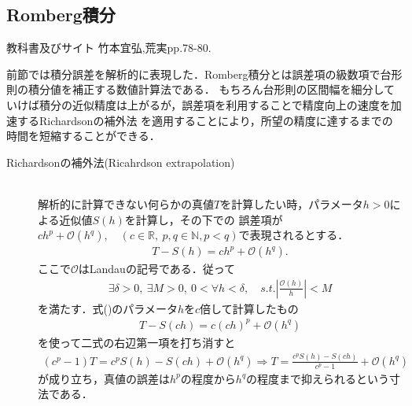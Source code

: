 \documentclass[a4j,papersize,disablejfam,slide,14pt]{jsarticle}
\begin{document}
\subsection{{\rm Romberg}積分}
	\begin{itembox}[l]{教科書及びサイト}
    	{\rm 竹本宜弘,荒実\cite{pascal_numerical}pp.78-80.}
    \end{itembox}
	前節では積分誤差を解析的に表現した．{\rm Romberg}積分とは誤差項の級数項で台形則の積分値を補正する数値計算法である．
    もちろん台形則の区間幅を細分していけば積分の近似精度は上がるが，誤差項を利用することで精度向上の速度を加速する{\rm Richardson}の補外法
    を適用することにより，所望の精度に達するまでの時間を短縮することができる．
    \begin{screen}
    	\begin{description}
        	\item[{\rm Richardson}の補外法({\rm Ricahrdson extrapolation})]\mbox{}\\
            	解析的に計算できない何らかの真値$T$を計算したい時，パラメータ$h>0$による近似値$S(h)$を計算し，その下での
                誤差項が$c h^p + \mathcal{O}(h^q), \quad(c \in \mathbb{R},\ p, q \in \mathbb{N}, p<q)$で表現されるとする．
                \begin{align}
                	T - S(h) = c h^p + \mathcal{O}(h^q). \label{eq:richardson}
                \end{align}
                ここで$\mathcal{O}$は{\rm Landau}の記号である．従って
                \begin{align}
                	\exists \delta>0,\ \exists M > 0,\ 0 < \forall h < \delta, \quad s.t. \left| \frac{\mathcal{O}(h)}{h} \right| < M
                \end{align}
                を満たす．式()のパラメータ$h$を$c$倍して計算したもの
                \begin{align}
                	T - S(ch) = c (ch)^p + \mathcal{O}(h^q)
                \end{align}
                を使って二式の右辺第一項を打ち消すと
                \begin{align}
                	(c^p - 1)T = c^p S(h) - S(ch) + \mathcal{O}(h^q) \Rightarrow
                    T = \frac{ c^p S(h) - S(ch)}{c^p - 1} + \mathcal{O}(h^q)
                \end{align}
                が成り立ち，真値の誤差は$h^p$の程度から$h^q$の程度まで抑えられるという寸法である．
        \end{description}
    \end{screen}
    
\end{document}
